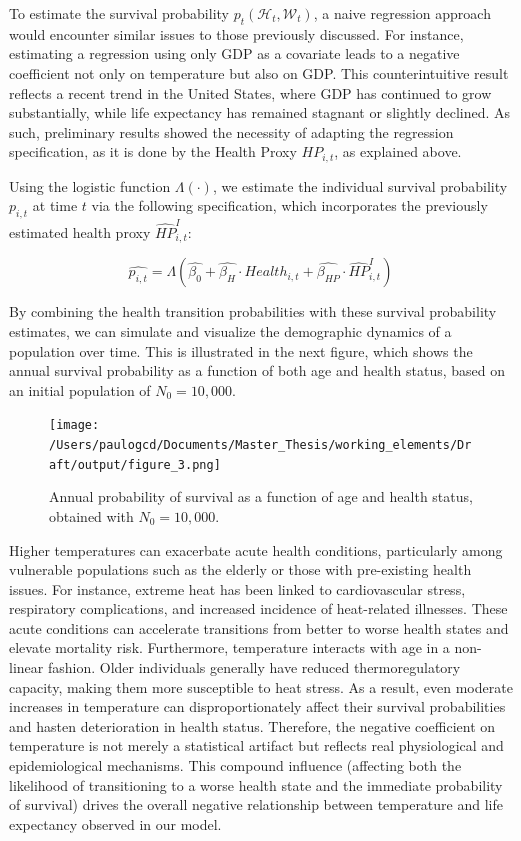 \documentclass{article}
\begin{document}
To estimate the survival probability \( p_t(\mathcal{H}_t, \mathcal{W}_t) \), a naive regression approach would encounter similar issues to those previously discussed.
For instance, estimating a regression using only GDP as a covariate leads to a negative coefficient not only on temperature but also on GDP.
This counterintuitive result reflects a recent trend in the United States, where GDP has continued to grow substantially, while life expectancy has remained stagnant or slightly declined.
As such, preliminary results showed the necessity of adapting the regression specification, as it is done by the Health Proxy $HP_{i,t}$, as explained above.

Using the logistic function \( \Lambda(\cdot) \), we estimate the individual survival probability \( p_{i,t} \) at time \( t \) via the following specification, which incorporates the previously estimated health proxy \( \widehat{HP}_{i,t}^{I} \):

\begin{equation}
    \widehat{p_{i,t}} = \Lambda \left( \widehat{\beta_0} +
    \widehat{\beta_{H}} \cdot Health_{i,t} +
    \widehat{\beta_{HP}} \cdot \widehat{HP}_{i,t}^{I} \right)
\end{equation}

By combining the health transition probabilities with these survival probability estimates, we can simulate and visualize the demographic dynamics of a population over time.
This is illustrated in the next figure, which shows the annual survival probability as a function of both age and health status, based on an initial population of \( N_0 = 10{,}000 \).

\begin{figure}[H]
    \centering
    \texttt{[image: /Users/paulogcd/Documents/Master\_Thesis/working\_elements/Draft/output/figure\_3.png]}
    \caption{Annual probability of survival as a function of age and health status, obtained with \( N_0 = 10{,}000 \).}
    \label{survival_probability}
\end{figure}

Higher temperatures can exacerbate acute health conditions, particularly among vulnerable populations such as the elderly or those with pre-existing health issues.
For instance, extreme heat has been linked to cardiovascular stress, respiratory complications, and increased incidence of heat-related illnesses.
These acute conditions can accelerate transitions from better to worse health states and elevate mortality risk.
Furthermore, temperature interacts with age in a non-linear fashion. Older individuals generally have reduced thermoregulatory capacity, making them more susceptible to heat stress.
As a result, even moderate increases in temperature can disproportionately affect their survival probabilities and hasten deterioration in health status.
Therefore, the negative coefficient on temperature is not merely a statistical artifact but reflects real physiological and epidemiological mechanisms.
This compound influence (affecting both the likelihood of transitioning to a worse health state and the immediate probability of survival) drives the overall negative relationship between temperature and life expectancy observed in our model.
\end{document}
